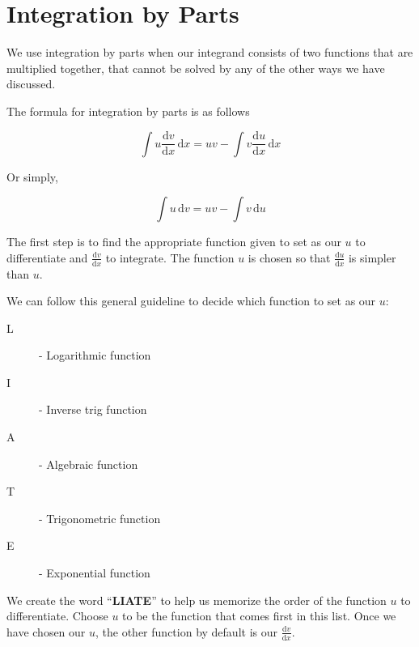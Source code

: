 \documentclass[11pt,a4paper]{book}
\begin{document}
\newpage{}

\section{Integration by Parts}

We use integration by parts when our integrand consists of two functions
that are multiplied together, that cannot be solved by any of the
other ways we have discussed.

\begin{tcolorbox}[colback=blue!5, colframe=black, boxrule=.4pt, sharpish corners]

The formula for integration by parts is as follows

\[
\int u\frac{\mathrm{d}v}{\mathrm{d}x}\, \mathrm{d}x=uv-\int v\frac{\mathrm{d}u}{\mathrm{d}x}\, \mathrm{d}x
\]

Or simply,

\[
\int u \,  \mathrm{d}v=uv-\int v\, \mathrm{d}u
\]
\end{tcolorbox}

The first step is to find the appropriate function given to set as
our $u$ to differentiate and ${\displaystyle \frac{\mathrm{d}v}{\mathrm{d}x}}$ to
integrate. The function $u$ is chosen so that ${\displaystyle \frac{\mathrm{d}u}{\mathrm{d}x}}$
is simpler than $u$.

We can follow this general guideline to decide which function to set
as our $u$:
\begin{description}
\item [{\hspace{1cm}L}] - Logarithmic function
\item [{\hspace{1cm}I}] - Inverse trig function
\item [{\hspace{1cm}A}] - Algebraic function
\item [{\hspace{1cm}T}] - Trigonometric function
\item [{\hspace{1cm}E}] - Exponential function
\end{description}
We create the word ``\textbf{LIATE}'' to help us memorize the order
of the function $u$ to differentiate. Choose $u$ to be the function
that comes first in this list. Once we have chosen our $u$, the other
function by default is our ${\displaystyle \frac{\mathrm{d}v}{\mathrm{d}x}}$.
\end{document}
